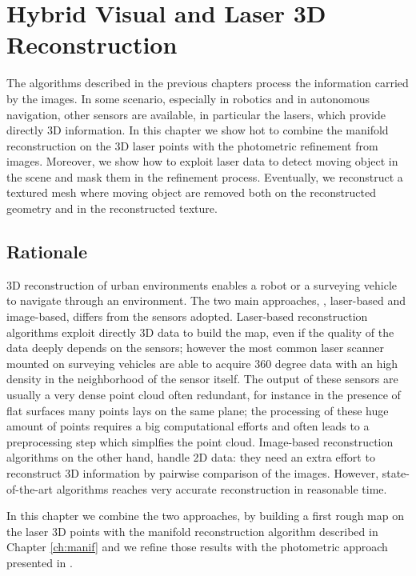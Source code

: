 \chapter[Hybrid Visual and Laser 3D Reconstruction]{Hybrid Visual and Laser 3D Reconstruction}
\label{ch:laser}
The algorithms described in the previous chapters process the information carried by the images. 
In some scenario, especially in robotics and in autonomous navigation, other sensors are available, in particular the lasers, which provide directly 3D information.
In this chapter we show hot to combine the manifold reconstruction on the  3D laser points with the photometric refinement from images.
Moreover, we show how to exploit laser data to detect moving object in the scene and mask them in the refinement process. 
Eventually, we reconstruct a textured mesh where moving object are removed both on the reconstructed geometry and in the reconstructed texture.

\minitoc
\newpage
\section{Rationale}
3D reconstruction of urban environments enables a robot or a surveying vehicle to navigate through an environment.
The two main approaches, \ie, laser-based and image-based, differs from the sensors adopted. 
Laser-based reconstruction algorithms exploit directly 3D data to build the map, even if the quality of the data deeply depends on the sensors; however the most common laser scanner mounted on surveying vehicles are able to acquire 360 degree data with an high density in the neighborhood of the sensor itself. 
The output of these sensors are usually a very dense point cloud often redundant, for instance in the presence of flat surfaces many points lays on the same plane; the processing of these huge amount of points requires a big computational efforts and often leads to a preprocessing step which simplfies the point cloud.
Image-based reconstruction algorithms on the other hand, handle 2D data: they need an extra effort to  reconstruct 3D information by pairwise comparison of the images. However, state-of-the-art algorithms \cite{vu_et_al_2012,li2015detail} reaches very accurate reconstruction in reasonable time.

In this chapter we combine the two approaches, by building a first rough map on the laser 3D points with the manifold reconstruction algorithm described in Chapter \ref{ch:manif} and we refine those results with the photometric approach presented in \cite{vu_et_al_2012,li2015detail}.

